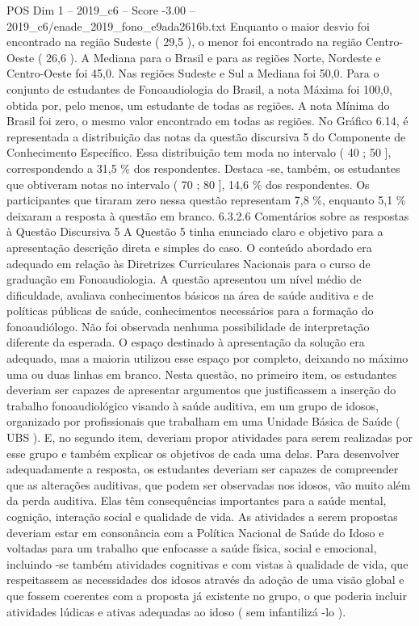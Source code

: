 \begin{textsample}{POS Dim 1 – 2019\_c6 – Score -3.00 – 2019\_c6/enade\_2019\_fono\_e9ada2616b.txt}
Enquanto o maior desvio foi encontrado na região Sudeste ( 29,5 ), o menor foi encontrado na região Centro-Oeste ( 26,6 ).
A Mediana para o Brasil e para as regiões Norte, Nordeste e Centro-Oeste foi 45,0.
Nas regiões Sudeste e Sul a Mediana foi 50,0.
Para o conjunto de estudantes de Fonoaudiologia do Brasil, a nota Máxima foi 100,0, obtida por, pelo menos, um estudante de todas as regiões.
A nota Mínima do Brasil foi zero, o mesmo valor encontrado em todas as regiões.
No Gráfico 6.14, é representada a distribuição das notas da questão discursiva 5 do Componente de Conhecimento Específico.
Essa distribuição tem moda no intervalo ( 40 ; 50 ], correspondendo a 31,5 \% dos respondentes.
Destaca -se, também, os estudantes que obtiveram notas no intervalo ( 70 ; 80 ], 14,6 \% dos respondentes.
Os participantes que tiraram zero nessa questão representam 7,8 \%, enquanto 5,1 \% deixaram a resposta à questão em branco. 6.3.2.6 Comentários sobre as respostas à Questão Discursiva 5 A Questão 5 tinha enunciado claro e objetivo para a apresentação descrição direta e simples do caso.
O conteúdo abordado era adequado em relação às Diretrizes Curriculares Nacionais para o curso de graduação em Fonoaudiologia.
A questão apresentou um nível médio de dificuldade, avaliava conhecimentos básicos na área de saúde auditiva e de políticas públicas de saúde, conhecimentos necessários para a formação do fonoaudiólogo.
Não foi observada nenhuma possibilidade de interpretação diferente da esperada.
O espaço destinado à apresentação da solução era adequado, mas a maioria utilizou esse espaço por completo, deixando no máximo uma ou duas linhas em branco.
Nesta questão, no primeiro item, os estudantes deveriam ser capazes de apresentar argumentos que justificassem a inserção do trabalho fonoaudiológico visando à saúde auditiva, em um grupo de idosos, organizado por profissionais que trabalham em uma Unidade Básica de Saúde ( UBS ).
E, no segundo item, deveriam propor atividades para serem realizadas por esse grupo e também explicar os objetivos de cada uma delas.
Para desenvolver adequadamente a resposta, os estudantes deveriam ser capazes de compreender que as alterações auditivas, que podem ser observadas nos idosos, vão muito além da perda auditiva.
Elas têm consequências importantes para a saúde mental, cognição, interação social e qualidade de vida.
As atividades a serem propostas deveriam estar em consonância com a Política Nacional de Saúde do Idoso e voltadas para um trabalho que enfocasse a saúde física, social e emocional, incluindo -se também atividades cognitivas e com vistas à qualidade de vida, que respeitassem as necessidades dos idosos através da adoção de uma visão global e que fossem coerentes com a proposta já existente no grupo, o que poderia incluir atividades lúdicas e ativas adequadas ao idoso ( sem infantilizá -lo ).

\end{textsample}
